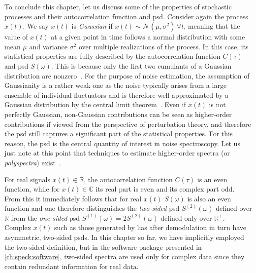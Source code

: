 To conclude this chapter, let us discuss some of the properties of stochastic processes and their autocorrelation function and \gls{psd}.
Consider again the process $x(t)$.
We say $x(t)$ is \emph{Gaussian} if $x(t)\sim\mathcal{N}(\mu, \sigma^2)\,\forall t$, meaning that the value of $x(t)$ at a given point in time follows a normal distribution with some mean $\mu$ and variance $\sigma^2$ over multiple realizations of the process.
In this case, its statistical properties are fully described by the autocorrelation function $C(\tau)$ and \gls{psd} $S(\omega)$.
This is because only the first two cumulants of a Gaussian distribution are nonzero~\cite{Fox1978}.
For the purpose of noise estimation, the assumption of Gaussianity is a rather weak one as the noise typically arises from a large ensemble of individual fluctuators and is therefore well approximated by a Gaussian distribution by the central limit theorem~\cite{Krzywda2020}.
Even if $x(t)$ is not perfectly Gaussian, non-Gaussian contributions can be seen as higher-order contributions if viewed from the perspective of perturbation theory, and therefore the \gls{psd} still captures a significant part of the statistical properties.
For this reason, the \gls{psd} is the central quantity of interest in noise spectroscopy.
Let us just note at this point that techniques to estimate higher-order spectra (or \emph{polyspectra}) exist~\cite{Chandran1994,Norris2016,Szankowski2017}.

For real signals $x(t)\in\mathbb{R}$, the autocorrelation function $C(\tau)$ is an even function, while for $x(t)\in\mathbb{C}$ its real part is even and its complex part odd.
From this it immediately follows that for real $x(t)$ $S(\omega)$ is also an even function and one therefore distinguishes the \emph{two-sided} \gls{psd} $S^{(2)}(\omega)$ defined over $\mathbb{R}$ from the \emph{one-sided} \gls{psd} $S^{(1)}(\omega) = 2 S^{(2)}(\omega)$ defined only over $\mathbb{R}^+$.
Complex $x(t)$ such as those generated by \glspl{lia} after demodulation in turn have asymmetric, two-sided \glspl{psd}.
In this chapter so far, we have implicitly employed the two-sided definition, but in the software package presented in \cref{ch:speck:software}, two-sided spectra are used only for complex data since they contain redundant information for real data.
